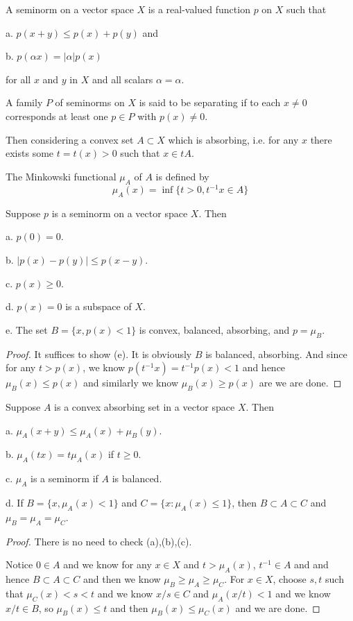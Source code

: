 \documentclass[lang=en, color=blue, ]{elegantbook}
\begin{document}
\begin{definition}
    A seminorm on a vector space $X$ is a real-valued function $p$ on $X$ such that\par
    a. $p(x+y) \leq p(x) + p(y)$ and\par
    b. $p(\alpha x) = |\alpha|p(x)$\par
    for all $x$ and $y$ in $X$ and all scalars $\alpha = \alpha$.\par
    A family $P$ of seminorms on $X$ is said to be separating if to each $x\neq 0$ corresponds at least one $p\in P$ with $p(x) \neq 0$.\par
    Then considering a convex set $A\subset X$ which is absorbing, i.e. for any $x$ there exists some $t = t(x) > 0$ such that $x\in tA$.\par
    The Minkowski functional $\mu_A$ of $A$ is defined by
    \[\mu_A(x) = \inf\{t>0, t^{-1}x \in A\}\]
\end{definition}

\begin{theorem}
    Suppose $p$ is a seminorm on a vector space $X$. Then\par
    a. $p(0) = 0$.\par
    b. $|p(x)-p(y)| \leq p(x-y)$.\par
    c. $p(x) \geq 0$.\par
    d. $p(x) = 0$ is a subspace of $X$.\par
    e. The set $B = \{x,p(x) < 1\}$ is convex, balanced, absorbing, and $p = \mu_B$. 
\end{theorem}
\begin{proof}
    It suffices to show (e). It is obviously $B$ is balanced, absorbing. And since for any $t > p(x)$, we know $p(t^{-1}x) = t^{-1}p(x) < 1$ and hence $\mu_B(x) \leq p(x)$ and similarly we know $\mu_B(x) \geq p(x)$ are we are done.
\end{proof}

\begin{theorem}
    Suppose $A$ is a convex absorbing set in a vector space $X$. Then\par
    a. $\mu_A(x+y) \leq \mu_A(x) + \mu_B(y)$.\par
    b. $\mu_A(tx) = t\mu_A(x)$ if $t\geq 0$.\par
    c. $\mu_A$ is a seminorm if $A$ is balanced.\par
    d. If $B = \{x, \mu_A(x) < 1\}$ and $C = \{x:\mu_A(x) \leq 1\}$, then $B\subset A\subset C$ and $\mu_B = \mu_A = \mu_C$.
\end{theorem}
\begin{proof}
    There is no need to check (a),(b),(c).\par
    Notice $0 \in A$ and we know for any $x\in X$ and $t>\mu_A(x)$, $t^{-1} \in A$ and and hence $B\subset A \subset C$ and then we know $\mu_B \geq \mu_A \geq \mu_C$. For $x\in X$, choose $s,t$ such that $\mu_C(x) < s < t$ and we know $x/s \in C$ and $\mu_A(x/t) < 1$ and we know $x/t \in B$, so $\mu_B(x) \leq t$ and then $\mu_B(x) \leq \mu_C(x)$ and we are done.
\end{proof}
\end{document}
